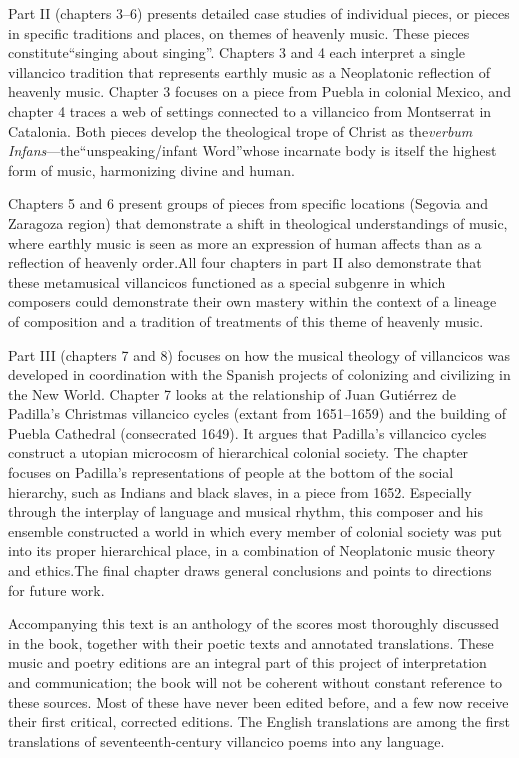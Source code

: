 \documentclass{memoir}
\begin{document}
Part II (chapters 3--6) presents detailed case studies of individual pieces, or pieces in specific traditions and places, on themes of heavenly music. These pieces constitute\enquote{singing about singing}. Chapters 3 and 4 each interpret a single villancico tradition that represents earthly music as a Neoplatonic reflection of heavenly music. Chapter 3 focuses on a piece from Puebla in colonial Mexico, and chapter 4 traces a web of settings connected to a villancico from Montserrat in Catalonia. Both pieces develop the theological trope of Christ as the\emph{verbum Infans}—the\enquote{unspeaking/infant Word}whose incarnate body is itself the highest form of music, harmonizing divine and human.

Chapters 5 and 6 present groups of pieces from specific locations (Segovia and Zaragoza region) that demonstrate a shift in theological understandings of music, where earthly music is seen as more an expression of human affects than as a reflection of heavenly order.All four chapters in part II also demonstrate that these metamusical villancicos functioned as a special subgenre in which composers could demonstrate their own mastery within the context of a lineage of composition and a tradition of treatments of this theme of heavenly music.

Part III (chapters 7 and 8) focuses on how the musical theology of villancicos was developed in coordination with the Spanish projects of colonizing and civilizing in the New World. Chapter 7 looks at the relationship of Juan Gutiérrez de Padilla’s Christmas villancico cycles (extant from 1651--1659) and the building of Puebla Cathedral (consecrated 1649). It argues that Padilla’s villancico cycles construct a utopian microcosm of hierarchical colonial society. The chapter focuses on Padilla’s representations of people at the bottom of the social hierarchy, such as Indians and black slaves, in a piece from 1652. Especially through the interplay of language and musical rhythm, this composer and his ensemble constructed a world in which every member of colonial society was put into its proper hierarchical place, in a combination of Neoplatonic music theory and ethics.The final chapter draws general conclusions and points to directions for future work.

Accompanying this text is an anthology of the scores most thoroughly discussed in the book, together with their poetic texts and annotated translations. These music and poetry editions are an integral part of this project of interpretation and communication; the book will not be coherent without constant reference to these sources. Most of these have never been edited before, and a few now receive their first critical, corrected editions. The English translations are among the first translations of seventeenth-century villancico poems into any language.
\end{document}
